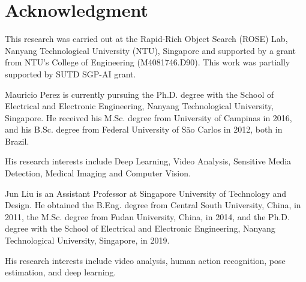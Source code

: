 \documentclass[journal,twoside]{IEEEtran}
\begin{document}
\section*{Acknowledgment}

This research was carried out at the Rapid-Rich Object Search (ROSE) Lab, Nanyang Technological University (NTU), Singapore and supported by a grant from NTU’s College of Engineering (M4081746.D90).
This work was partially supported by SUTD SGP-AI grant.

\ifCLASSOPTIONcaptionsoff
  \newpage
\fi










\begin{IEEEbiography}{Mauricio Perez}
is currently pursuing the Ph.D. degree with the School of Electrical and Electronic Engineering, Nanyang Technological University, Singapore. He received his M.Sc. degree from University of Campinas in 2016, and his B.Sc. degree from Federal University of São Carlos in 2012, both in Brazil.

His research interests include Deep Learning, Video Analysis, Sensitive Media Detection, Medical Imaging and Computer Vision.
\end{IEEEbiography}


\begin{IEEEbiography}{Jun Liu}
is an Assistant Professor at Singapore University of Technology and Design. He 
obtained the B.Eng. degree from Central South University, China, in 2011, the M.Sc. degree from Fudan University, China, in 2014, and the Ph.D. degree with the School of Electrical and Electronic Engineering, Nanyang Technological University, Singapore, in 2019.

His research interests include video analysis, human action recognition, pose estimation, and deep learning.
\end{IEEEbiography}

\vfill

\newpage
\end{document}
